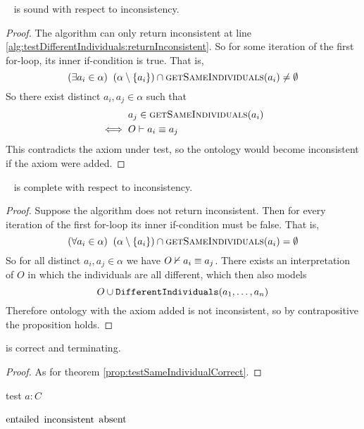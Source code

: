 \documentclass[paper.tex]{subfiles}
\begin{document}
\begin{proposition}
  \sloppy~
   is sound with respect to inconsistency.
\end{proposition}
\begin{proof}
  The algorithm can only return inconsistent at line \ref{alg:testDifferentIndividuals:returnInconsistent}.  So for some iteration of the first for-loop, its inner if-condition is true.  That is,
  \[ (\exists a_i \in \alpha) \;\; (\alpha \setminus \{a_i\}) \intersect \Call{getSameIndividuals}{a_i} \ne \emptyset \]
  So there exist distinct $a_i, a_j \in \alpha$ such that
  \begin{align*}
    & a_j \in \Call{getSameIndividuals}{a_i} \\
    \iff{}& O \sementails a_i \equiv a_j
  \end{align*}
  This contradicts the axiom under test, so the ontology would become inconsistent if the axiom were added.
\end{proof}

\begin{proposition}
  \sloppy~
   is complete with respect to inconsistency.
\end{proposition}
\begin{proof}
  Suppose the algorithm does not return inconsistent.  Then for every iteration of the first for-loop its inner if-condition must be false.  That is,
  \[ (\forall a_i \in \alpha) \;\; (\alpha \setminus \{a_i\}) \intersect \Call{getSameIndividuals}{a_i} = \emptyset \]
  So for all distinct $a_i, a_j \in \alpha$ we have $O \nvdash a_i \equiv a_j$.  There exists an interpretation of $O$ in which the individuals are all different, which then also models
  \[ O \cup \mathtt{DifferentIndividuals}(a_1, \ldots, a_n) \]
  Therefore ontology with the axiom added is not inconsistent, so by contrapositive the proposition holds.
\end{proof}

\begin{theorem}
   is correct and terminating.
\end{theorem}
\begin{proof}
  As for theorem \ref{prop:testSameIndividualCorrect}.
\end{proof}


\begin{algorithm}[H]
  \caption{test $a : C$}
  \begin{algorithmic}[1]
    \raggedright
        \State \Return $\mathrm{entailed}$
        \label{alg:testClassAssertion:returnEntailed}
        \State \Return $\mathrm{inconsistent}$
        \label{alg:testClassAssertion:returnInconsistent}
      \Else
        \State \Return $\mathrm{absent}$
      \EndIf
    \EndFunction
  \end{algorithmic}
\end{algorithm}
\end{document}
